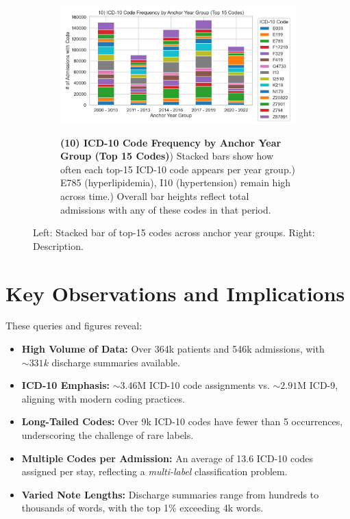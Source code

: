 \begin{figure}[ht!]
    \centering
    \begin{subfigure}{0.42\textwidth}
        \includegraphics[width=\linewidth]{mimic_plots/plot10.jpg}
    \end{subfigure}\hfill
    \begin{subfigure}{0.54\textwidth}
        \footnotesize
        \textbf{(10) ICD-10 Code Frequency by Anchor Year Group (Top 15 Codes)}) Stacked bars show how often each top-15 ICD-10 code appears per year group.) E785 (hyperlipidemia), I10 (hypertension) remain high across time.) Overall bar heights reflect total admissions with any of these codes in that period.
    \end{subfigure}
    \caption{Left: Stacked bar of top-15 codes across anchor year groups. Right: Description.}
    \label{fig:plot10}
\end{figure}

\section{Key Observations and Implications}
These queries and figures reveal:
\begin{itemize}
    \item \textbf{High Volume of Data:} Over 364k patients and 546k admissions, with \(\sim331k\) discharge summaries available.
    \item \textbf{ICD-10 Emphasis:} \(\sim3.46\)M ICD-10 code assignments vs. \(\sim2.91\)M ICD-9, aligning with modern coding practices.
    \item \textbf{Long-Tailed Codes:} Over 9k ICD-10 codes have fewer than 5 occurrences, underscoring the challenge of rare labels.
    \item \textbf{Multiple Codes per Admission:} An average of 13.6 ICD-10 codes assigned per stay, reflecting a \textit{multi-label} classification problem.
    \item \textbf{Varied Note Lengths:} Discharge summaries range from hundreds to thousands of words, with the top 1\% exceeding 4k words.
\end{itemize}

